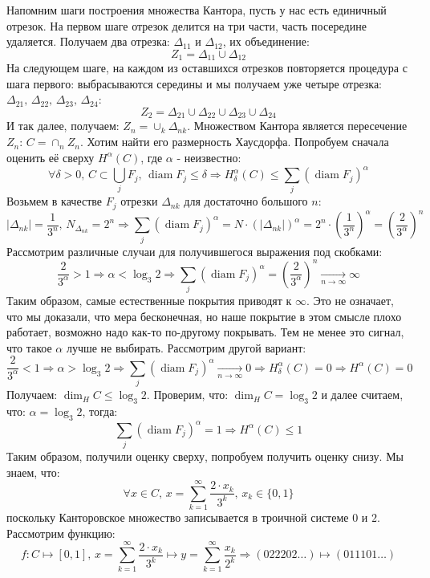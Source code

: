 \documentclass[12pt]{article}
\theoremstyle{definition}
\DeclareMathOperator{\diam}{\text{diam}}
\newcommand{\ddsum}[2]{\displaystyle\sum\limits_{#1}^{#2}}
\begin{document}
Напомним шаги построения множества Кантора, пусть у нас есть единичный отрезок. На первом шаге отрезок делится на три части, часть посередине удаляется. Получаем два отрезка: $\Delta_{11}$ и $\Delta_{12}$, их объединение:
$$
	Z_1 = \Delta_{11} \cup \Delta_{12}
$$
На следующем шаге, на каждом из оставшихся отрезков повторяется процедура с шага первого: выбрасываются середины и мы получаем уже четыре отрезка: $\Delta_{21}, \, \Delta_{22}, \, \Delta_{23}, \, \Delta_{24}$:
$$
	Z_2 = \Delta_{21}\cup \Delta_{22} \cup \Delta_{23} \cup \Delta_{24}
$$
И так далее, получаем: $Z_n = \cup_k \Delta_{nk}$. Множеством Кантора является пересечение $Z_n$: $C = \cap_n Z_n$. Хотим найти его размерность Хаусдорфа. Попробуем сначала оценить её сверху $H^\alpha(C)$, где $\alpha$ - неизвестно:
$$
	\forall \delta > 0, \, C \subset \bigcup\limits_j F_j, \, \diam{F_j} \leq \delta \Rightarrow H_\delta^\alpha(C) \leq \ddsum{j}{}(\diam{F_j})^\alpha
$$
Возьмем в качестве $F_j$ отрезки $\Delta_{nk}$ для достаточно большого $n$:
$$
	|\Delta_{nk}| = \dfrac{1}{3^n}, \, N_{\Delta_{nk}} = 2^n \Rightarrow \ddsum{j}{}(\diam{F_j})^\alpha = N{\cdot}(|\Delta_{nk}|)^\alpha = 2^n{\cdot}\left(\dfrac{1}{3^n}\right)^\alpha = \left(\dfrac{2}{3^\alpha}\right)^n
$$
Рассмотрим различные случаи для получившегося выражения под скобками:
$$
	\dfrac{2}{3^\alpha} > 1 \Rightarrow \alpha < \log_3{2} \Rightarrow \ddsum{j}{}(\diam{F_j})^\alpha = \left(\dfrac{2}{3^\alpha}\right)^n \xrightarrow[n \to \infty]{} \infty 
$$
Таким образом, самые естественные покрытия приводят к $\infty$. Это не означает, что мы доказали, что мера бесконечная, но наше покрытие в этом смысле плохо работает, возможно надо как-то по-другому покрывать. Тем не менее это сигнал, что такое $\alpha$ лучше не выбирать. Рассмотрим другой вариант:
$$
	\dfrac{2}{3^\alpha} < 1 \Rightarrow \alpha > \log_3{2} \Rightarrow \ddsum{j}{}(\diam{F_j})^\alpha \xrightarrow[n \to \infty]{} 0  \Rightarrow H_\delta^\alpha(C) = 0 \Rightarrow H^\alpha(C) = 0
$$
Получаем: $\dim_H{C} \leq \log_3{2}$. Проверим, что: $\dim_H{C} = \log_3{2}$ и далее считаем, что: $\alpha = \log_3{2}$, тогда:
$$
	\ddsum{j}{}(\diam{F_j})^\alpha = 1 \Rightarrow H^\alpha(C) \leq 1
$$
Таким образом, получили оценку сверху, попробуем получить оценку снизу. Мы знаем, что:
$$
	\forall x \in C, \, x = \ddsum{k = 1}{\infty}\dfrac{2{\cdot}x_k}{3^k}, \, x_k \in \{0,1\}
$$
поскольку Канторовское множество записывается в троичной системе $0$ и $2$. Рассмотрим функцию:
$$
	f\colon C \mapsto [0,1], \, x = \ddsum{k = 1}{\infty}\dfrac{2{\cdot}x_k}{3^k} \mapsto y = \ddsum{k = 1}{\infty}\dfrac{x_k}{2^k} \Rightarrow (0 2 2 2 0 2 \dotsc) \mapsto (0 1 1 1 0 1 \dotsc)
$$
\end{document}
